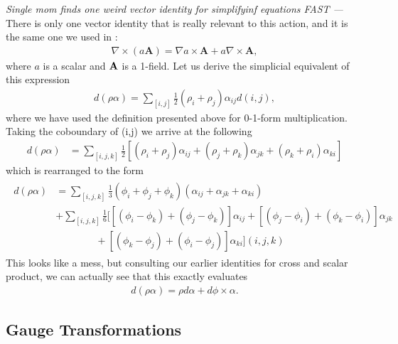 \documentclass[11pt, oneside]{article} %
\numberwithin{equation}{section}
\begin{document}
\begin{shaded}
    {\it Single mom finds one weird vector identity for simplifyinf equations FAST --- } There is only one vector identity that is really relevant to this action, and it is the same one we used in \textsection{\ref{sec:continuous_special_time}}:
    \begin{align} 
            \nabla \times (a \textbf{A}) = \nabla a \times \textbf{A} + a \nabla \times \textbf{A},
        \end{align}
        where $a$ is a scalar and $\textbf A$ is a 1-field. Let us derive the simplicial equivalent of this expression
        \begin{align}
            d(\rho \alpha) = \sum_{[i,j]}\frac 12 (\rho_i + \rho_j) \alpha_{ij} d(i,j),
        \end{align}
        where we have used the definition presented above for 0-1-form multiplication. Taking the coboundary of (i,j) we arrive at the following
        \begin{align}
             d(\rho \alpha) &= \sum_{[i,j,k]}\frac 12 
             \left [
             (\rho_i + \rho_j)\alpha_{ij}
             + (\rho_j + \rho_k)\alpha_{jk}
             +(\rho_k + \rho_i)\alpha_{ki}
             \right ]
        \end{align}
    which is rearranged to the form
    \begin{align}
        \begin{aligned}
            d(\rho \alpha) &= \sum_{[i,j,k]} \frac 13 (\phi_i + \phi_j +\phi_k)(\alpha_{ij} + \alpha_{jk}+\alpha_{ki}) \\ 
            &
            + \sum_{[i,j,k]} \frac 16 \bigg [
            [(\phi_i - \phi_k) + (\phi_j - \phi_k)]\alpha_{ij}
            + [(\phi_j - \phi_i) + (\phi_k - \phi_i)]\alpha_{jk}\\& \qquad \qquad 
            + [(\phi_k - \phi_j) + (\phi_i - \phi_j)]\alpha_{ki}
            \bigg ] (i,j,k)
        \end{aligned}
    \end{align}
    This looks like a mess, but consulting our earlier identities for cross and scalar product, we can actually see that this exactly evaluates
    \begin{align}
        d(\rho \alpha) = \rho d\alpha + d\phi \times \alpha.
    \end{align}
\end{shaded}

\subsection{Gauge Transformations}


\end{document}
